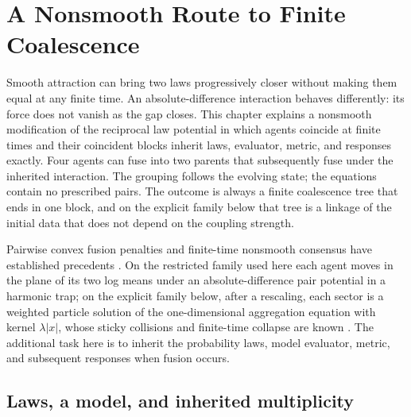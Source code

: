\chapter{A Nonsmooth Route to Finite Coalescence}
\label{comp:fusion}

Smooth attraction can bring two laws progressively closer without making them equal at any finite time. An absolute-difference interaction behaves differently: its force does not vanish as the gap closes. This chapter explains a nonsmooth modification of the reciprocal law potential in which agents coincide at finite times and their coincident blocks inherit laws, evaluator, metric, and responses exactly. Four agents can fuse into two parents that subsequently fuse under the inherited interaction. The grouping follows the evolving state; the equations contain no prescribed pairs. The outcome is always a finite coalescence tree that ends in one block, and on the explicit family below that tree is a linkage of the initial data that does not depend on the coupling strength.

Pairwise convex fusion penalties and finite-time nonsmooth consensus have established precedents \citep{Hocking2011,Cortes2006}. On the restricted family used here each agent moves in the plane of its two log means under an absolute-difference pair potential in a harmonic trap; on the explicit family below, after a rescaling, each sector is a weighted particle solution of the one-dimensional aggregation equation with kernel $\lambda|x|$, whose sticky collisions and finite-time collapse are known \citep{CarrilloEtAl2011,BonaschiEtAl2015}. The additional task here is to inherit the probability laws, model evaluator, metric, and subsequent responses when fusion occurs.

\section{Laws, a model, and inherited multiplicity}

